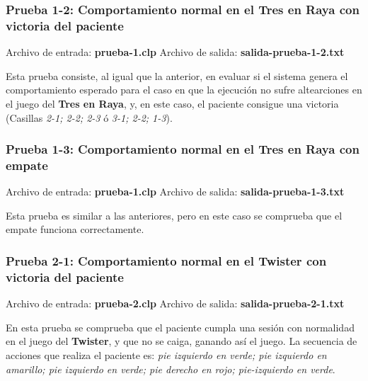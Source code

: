 \documentclass{uc3mpracticas}
\begin{document}
  \subsubsection{Prueba 1-2: Comportamiento normal en el Tres en Raya con victoria del paciente}


  Archivo de entrada: \textbf{prueba-1.clp} \hspace{15mm} Archivo de salida: \textbf{salida-prueba-1-2.txt}

  \vspace{2mm}

  Esta prueba consiste, al igual que la anterior, en evaluar si el sistema genera el comportamiento esperado para el caso en que la ejecución no sufre altearciones en el juego del \textbf{Tres en Raya}, y, en este caso, el paciente consigue una victoria (Casillas \textit{2-1; 2-2; 2-3} ó \textit{3-1; 2-2; 1-3}).


  \subsubsection{Prueba 1-3: Comportamiento normal en el Tres en Raya con empate}


  Archivo de entrada: \textbf{prueba-1.clp} \hspace{15mm} Archivo de salida: \textbf{salida-prueba-1-3.txt}

  \vspace{2mm}

  Esta prueba es similar a las anteriores, pero en este caso se comprueba que el empate funciona correctamente.


  \subsubsection{Prueba 2-1: Comportamiento normal en el Twister con victoria del paciente}


  Archivo de entrada: \textbf{prueba-2.clp} \hspace{15mm} Archivo de salida: \textbf{salida-prueba-2-1.txt}

  \vspace{2mm}

  En esta prueba se comprueba que el paciente cumpla una sesión con normalidad en el juego del \textbf{Twister}, y que no se caiga, ganando así el juego. La secuencia de acciones que realiza el paciente es: \textit{pie izquierdo en verde; pie izquierdo en amarillo; pie izquierdo en verde; pie derecho en rojo; pie-izquierdo en verde}.
\end{document}
